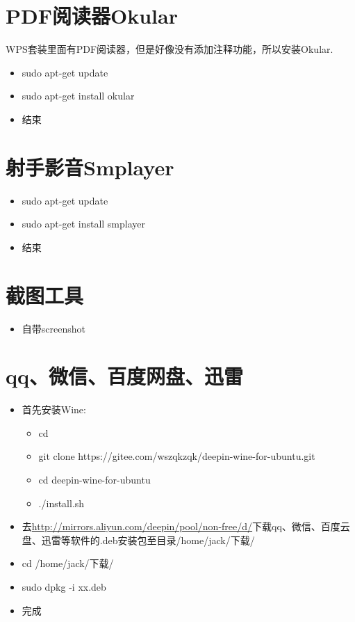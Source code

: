 \documentclass[utf8]{book}
\begin{document}
\begin{appendices}
	\section{PDF阅读器Okular}\label{u6}
	WPS套装里面有PDF阅读器，但是好像没有添加注释功能，所以安装Okular.
	\begin{itemize}
		\item sudo apt-get update
		\item sudo apt-get install okular
		\item 结束
	\end{itemize}

	\section{射手影音Smplayer}\label{u7}
	
	\begin{itemize}
		\item sudo apt-get update
		\item sudo apt-get install smplayer
		\item 结束
	\end{itemize}

	\section{截图工具}\label{u8}

	\begin{itemize}
		\item 自带screenshot
	\end{itemize}

	\section{qq、微信、百度网盘、迅雷}\label{u9}
	\begin{itemize}
		\item 首先安装Wine:
		\begin{itemize}
			\item cd ~
			\item git clone https://gitee.com/wszqkzqk/deepin-wine-for-ubuntu.git
			\item cd deepin-wine-for-ubuntu
			\item ./install.sh
		\end{itemize}
		\item 去\url{http://mirrors.aliyun.com/deepin/pool/non-free/d/}下载qq、微信、百度云盘、迅雷等软件的.deb安装包至目录/home/jack/下载/
		\item cd /home/jack/下载/
		\item sudo dpkg -i xx.deb
		\item 完成
		

\end{itemize}
\end{appendices}
\end{document}
